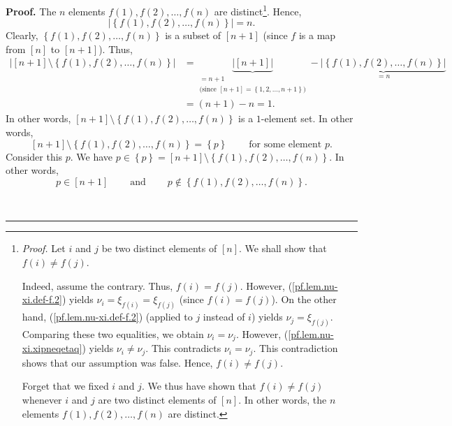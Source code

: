 \documentclass[numbers=enddot,12pt,final,onecolumn,notitlepage,english]{scrartcl}%
\theoremstyle{definition}
\newenvironment{proof}[1][Proof]{\noindent\textbf{#1.} }{\ \rule{0.5em}{0.5em}}
\newenvironment{verlong}{}{}
\begin{document}
\begin{verlong}
\begin{proof}
The $n$ elements $f\left(  1\right)  ,f\left(  2\right)  ,\ldots,f\left(
n\right)  $ are distinct\footnote{\textit{Proof.} Let $i$ and $j$ be two
distinct elements of $\left[  n\right]  $. We shall show that $f\left(
i\right)  \neq f\left(  j\right)  $.
\par
Indeed, assume the contrary. Thus, $f\left(  i\right)  =f\left(  j\right)  $.
However, (\ref{pf.lem.nu-xi.def-f.2}) yields $\nu_{i}=\xi_{f\left(  i\right)
}=\xi_{f\left(  j\right)  }$ (since $f\left(  i\right)  =f\left(  j\right)
$). On the other hand, (\ref{pf.lem.nu-xi.def-f.2}) (applied to $j$ instead of
$i$) yields $\nu_{j}=\xi_{f\left(  j\right)  }$. Comparing these two
equalities, we obtain $\nu_{i}=\nu_{j}$. However,
(\ref{pf.lem.nu-xi.xipneqetaq}) yields $\nu_{i}\neq\nu_{j}$. This contradicts
$\nu_{i}=\nu_{j}$. This contradiction shows that our assumption was false.
Hence, $f\left(  i\right)  \neq f\left(  j\right)  $.
\par
Forget that we fixed $i$ and $j$. We thus have shown that $f\left(  i\right)
\neq f\left(  j\right)  $ whenever $i$ and $j$ are two distinct elements of
$\left[  n\right]  $. In other words, the $n$ elements $f\left(  1\right)
,f\left(  2\right)  ,\ldots,f\left(  n\right)  $ are distinct.}. Hence,
\[
\left\vert \left\{  f\left(  1\right)  ,f\left(  2\right)  ,\ldots,f\left(
n\right)  \right\}  \right\vert =n.
\]
Clearly, $\left\{  f\left(  1\right)  ,f\left(  2\right)  ,\ldots,f\left(
n\right)  \right\}  $ is a subset of $\left[  n+1\right]  $ (since $f$ is a
map from $\left[  n\right]  $ to $\left[  n+1\right]  $). Thus,%
\begin{align*}
\left\vert \left[  n+1\right]  \setminus\left\{  f\left(  1\right)  ,f\left(
2\right)  ,\ldots,f\left(  n\right)  \right\}  \right\vert  &
=\underbrace{\left\vert \left[  n+1\right]  \right\vert }%
_{\substack{=n+1\\\text{(since }\left[  n+1\right]  =\left\{  1,2,\ldots
,n+1\right\}  \text{)}}}-\underbrace{\left\vert \left\{  f\left(  1\right)
,f\left(  2\right)  ,\ldots,f\left(  n\right)  \right\}  \right\vert }_{=n}\\
&  =\left(  n+1\right)  -n=1.
\end{align*}
In other words, $\left[  n+1\right]  \setminus\left\{  f\left(  1\right)
,f\left(  2\right)  ,\ldots,f\left(  n\right)  \right\}  $ is a $1$-element
set. In other words,
\[
\left[  n+1\right]  \setminus\left\{  f\left(  1\right)  ,f\left(  2\right)
,\ldots,f\left(  n\right)  \right\}  =\left\{  p\right\}
\ \ \ \ \ \ \ \ \ \ \text{for some element }p.
\]
Consider this $p$. We have $p\in\left\{  p\right\}  =\left[  n+1\right]
\setminus\left\{  f\left(  1\right)  ,f\left(  2\right)  ,\ldots,f\left(
n\right)  \right\}  $. In other words,
\[
p\in\left[  n+1\right]  \ \ \ \ \ \ \ \ \ \ \text{and}%
\ \ \ \ \ \ \ \ \ \ p\notin\left\{  f\left(  1\right)  ,f\left(  2\right)
,\ldots,f\left(  n\right)  \right\}  .
\]



\end{proof}
\end{verlong}
\end{document}
